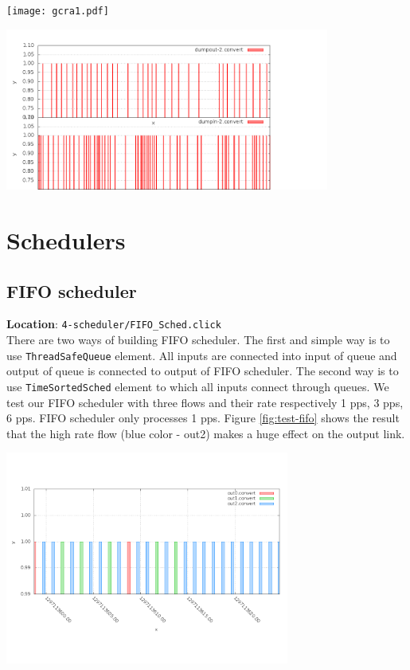 \documentclass[a4paper]{article}
\begin{document}
  \begin{center}
	\texttt{[image: gcra1.pdf]}
	\label{fig:gcra}
  \end{center}
  
  \begin{center}
	\includegraphics[width=0.80\textwidth]{test-gcra.png}
	\label{fig:test-gcra}
  \end{center}
  
  \section{Schedulers}
  \subsection{FIFO scheduler}
  \textbf{Location}: \texttt{4-scheduler/FIFO\_Sched.click}\\
  There are two ways of building FIFO scheduler. The first and simple way is to use \texttt{ThreadSafeQueue} element. All inputs are connected into input of queue and output of queue is connected to output of FIFO scheduler. The second way is to use \texttt{TimeSortedSched} element to which all inputs connect through queues. We test our FIFO scheduler with three flows and their rate respectively 1 pps, 3 pps, 6 pps. FIFO scheduler only processes 1 pps. Figure \ref{fig:test-fifo} shows the result that the high rate flow (blue color - out2) makes a huge effect on the output link.
  \begin{center}
	\includegraphics[width=0.70\textwidth]{fifo-dense.png}
	\label{fig:test-fifo}
  \end{center}
  
\end{document}
